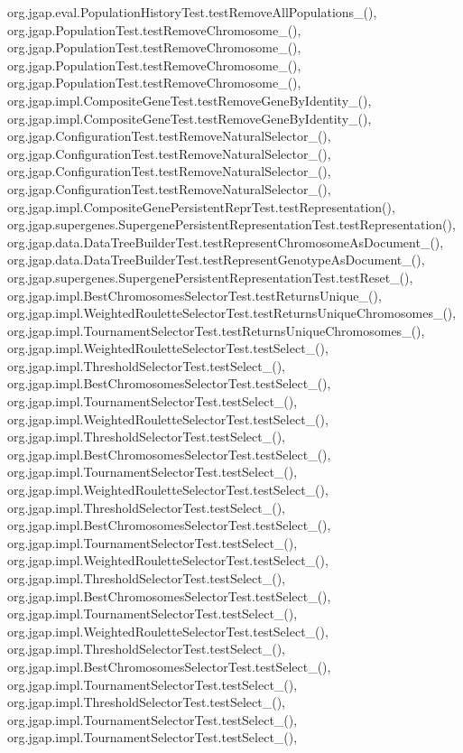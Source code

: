 org.\-jgap.\-eval.\-Population\-History\-Test.\-test\-Remove\-All\-Populations\-\_(), org.\-jgap.\-Population\-Test.\-test\-Remove\-Chromosome\-\_(), org.\-jgap.\-Population\-Test.\-test\-Remove\-Chromosome\-\_(), org.\-jgap.\-Population\-Test.\-test\-Remove\-Chromosome\-\_(), org.\-jgap.\-Population\-Test.\-test\-Remove\-Chromosome\-\_(), org.\-jgap.\-impl.\-Composite\-Gene\-Test.\-test\-Remove\-Gene\-By\-Identity\-\_(), org.\-jgap.\-impl.\-Composite\-Gene\-Test.\-test\-Remove\-Gene\-By\-Identity\-\_(), org.\-jgap.\-Configuration\-Test.\-test\-Remove\-Natural\-Selector\-\_(), org.\-jgap.\-Configuration\-Test.\-test\-Remove\-Natural\-Selector\-\_(), org.\-jgap.\-Configuration\-Test.\-test\-Remove\-Natural\-Selector\-\_(), org.\-jgap.\-Configuration\-Test.\-test\-Remove\-Natural\-Selector\-\_(), org.\-jgap.\-impl.\-Composite\-Gene\-Persistent\-Repr\-Test.\-test\-Representation(), org.\-jgap.\-supergenes.\-Supergene\-Persistent\-Representation\-Test.\-test\-Representation(), org.\-jgap.\-data.\-Data\-Tree\-Builder\-Test.\-test\-Represent\-Chromosome\-As\-Document\-\_(), org.\-jgap.\-data.\-Data\-Tree\-Builder\-Test.\-test\-Represent\-Genotype\-As\-Document\-\_(), org.\-jgap.\-supergenes.\-Supergene\-Persistent\-Representation\-Test.\-test\-Reset\-\_(), org.\-jgap.\-impl.\-Best\-Chromosomes\-Selector\-Test.\-test\-Returns\-Unique\-\_(), org.\-jgap.\-impl.\-Weighted\-Roulette\-Selector\-Test.\-test\-Returns\-Unique\-Chromosomes\-\_(), org.\-jgap.\-impl.\-Tournament\-Selector\-Test.\-test\-Returns\-Unique\-Chromosomes\-\_(), org.\-jgap.\-impl.\-Weighted\-Roulette\-Selector\-Test.\-test\-Select\-\_(), org.\-jgap.\-impl.\-Threshold\-Selector\-Test.\-test\-Select\-\_(), org.\-jgap.\-impl.\-Best\-Chromosomes\-Selector\-Test.\-test\-Select\-\_(), org.\-jgap.\-impl.\-Tournament\-Selector\-Test.\-test\-Select\-\_(), org.\-jgap.\-impl.\-Weighted\-Roulette\-Selector\-Test.\-test\-Select\-\_(), org.\-jgap.\-impl.\-Threshold\-Selector\-Test.\-test\-Select\-\_(), org.\-jgap.\-impl.\-Best\-Chromosomes\-Selector\-Test.\-test\-Select\-\_(), org.\-jgap.\-impl.\-Tournament\-Selector\-Test.\-test\-Select\-\_(), org.\-jgap.\-impl.\-Weighted\-Roulette\-Selector\-Test.\-test\-Select\-\_(), org.\-jgap.\-impl.\-Threshold\-Selector\-Test.\-test\-Select\-\_(), org.\-jgap.\-impl.\-Best\-Chromosomes\-Selector\-Test.\-test\-Select\-\_(), org.\-jgap.\-impl.\-Tournament\-Selector\-Test.\-test\-Select\-\_(), org.\-jgap.\-impl.\-Weighted\-Roulette\-Selector\-Test.\-test\-Select\-\_(), org.\-jgap.\-impl.\-Threshold\-Selector\-Test.\-test\-Select\-\_(), org.\-jgap.\-impl.\-Best\-Chromosomes\-Selector\-Test.\-test\-Select\-\_(), org.\-jgap.\-impl.\-Tournament\-Selector\-Test.\-test\-Select\-\_(), org.\-jgap.\-impl.\-Weighted\-Roulette\-Selector\-Test.\-test\-Select\-\_(), org.\-jgap.\-impl.\-Threshold\-Selector\-Test.\-test\-Select\-\_(), org.\-jgap.\-impl.\-Best\-Chromosomes\-Selector\-Test.\-test\-Select\-\_(), org.\-jgap.\-impl.\-Tournament\-Selector\-Test.\-test\-Select\-\_(), org.\-jgap.\-impl.\-Threshold\-Selector\-Test.\-test\-Select\-\_(), org.\-jgap.\-impl.\-Tournament\-Selector\-Test.\-test\-Select\-\_(), org.\-jgap.\-impl.\-Tournament\-Selector\-Test.\-test\-Select\-\_(), 